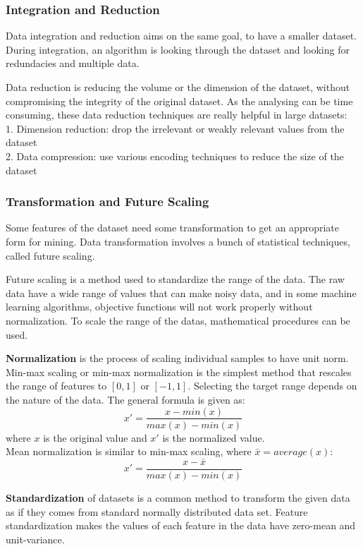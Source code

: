 \subsubsection{Integration and Reduction}

Data integration and reduction aims on the same goal, to have a smaller dataset. During integration, an algorithm is looking through the dataset and looking for redundacies and multiple data. \medskip

Data reduction is reducing the volume or the dimension of the dataset, without compromising the integrity of the original dataset. As the analysing can be time consuming, these data reduction techniques are really helpful in large datasets:\\
1. Dimension reduction: drop the irrelevant or weakly relevant values from the dataset\\
2. Data compression: use various encoding techniques to reduce the size of the dataset


\subsubsection{Transformation and Future Scaling}

Some features of the dataset need some transformation to get an appropriate form for mining. Data transformation involves a bunch of statistical techniques, called future scaling. \smallskip

Future scaling is a method used to standardize the range of the data. The raw data have a wide range of values that can make noisy data, and in some machine learning algorithms, objective functions will not work properly without normalization. To scale the range of the datas, mathematical procedures can be used.\medskip

\textbf{Normalization} is the process of scaling individual samples to have unit norm. Min-max scaling or min-max normalization is the simplest method that rescales the range of features to $[0, 1]$ or $[-1, 1]$. Selecting the target range depends on the nature of the data. The general formula is given as:
$$ x' = \frac{x-min(x)}{max(x)-min(x)} $$
where $x$ is the original value and $x'$ is the normalized value.\\
Mean normalization is similar to min-max scaling, where $\bar x = average(x)$:
$$ x' = \frac{x-\bar x}{max(x)-min(x)} $$ \medskip

\textbf{Standardization} of datasets is a common method to transform the given data as if they comes from standard normally distributed data set. Feature standardization makes the values of each feature in the data have zero-mean and unit-variance. \smallskip
	
